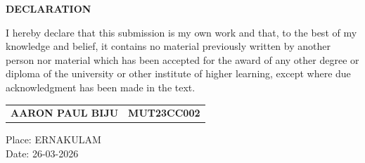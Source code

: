 \documentclass[a4paper,12pt,oneside]{report}
\begin{document}
\begin{titlepage}
{\scshape \centering \Large \bfseries DECLARATION \par}
\vspace{1.5cm}
{I hereby declare that this submission is my own work and that, to the best of my knowledge and belief, it contains no material previously written by another person nor material which has been accepted for the award of any other degree or diploma of the university or other institute of higher learning, except where due acknowledgment has been made in the text.}
\vspace{2cm}
\begin{flushright}
\begin{tabular}{lr}
\textbf{AARON PAUL BIJU} & \textbf{MUT23CC002} \\
\end{tabular}
\end{flushright}
\par

\vfill
\noindent Place: ERNAKULAM\\
\noindent Date: 26-03-2026
\end{titlepage}
\end{document}

